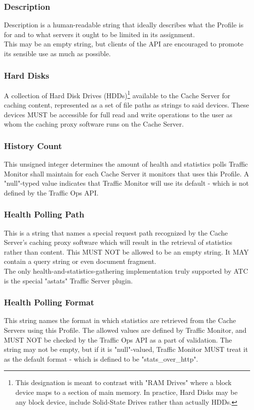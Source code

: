 \subsubsection{Description}
Description is a human-readable string that ideally describes what the Profile
is for and to what servers it ought to be limited in its assignment.\\
This may be an empty string, but clients of the API are encouraged to promote
its sensible use as much as possible.

\subsubsection{Hard Disks}
A collection of Hard Disk Drives (HDDs)\footnote{This designation is meant to
contrast with "RAM Drives" where a block device maps to a section of main
memory. In practice, Hard Disks may be any block device, include Solid-State
Drives rather than actually HDDs.} available to the Cache Server for caching
content, represented as a set of file paths as strings to said devices. These
devices MUST be accessible for full read and write operations to the user as
whom the caching proxy software runs on the Cache Server.

\subsubsection{History Count}
This unsigned integer determines the amount of health and statistics polls
Traffic Monitor shall maintain for each Cache Server it monitors that uses this
Profile. A "null"-typed value indicates that Traffic Monitor will use its
default - which is not defined by the Traffic Ops API.

\subsubsection{Health Polling Path}
This is a string that names a special request path recognized by the Cache
Server's caching proxy software which will result in the retrieval of statistics
rather than content. This MUST NOT be allowed to be an empty string. It MAY
contain a query string or even document fragment.\\
The only health-and-statistics-gathering implementation truly supported by ATC
is the special "astats" Traffic Server plugin.

\subsubsection{Health Polling Format}
This string names the format in which statistics are retrieved from the Cache
Servers using this Profile. The allowed values are defined by Traffic Monitor,
and MUST NOT be checked by the Traffic Ops API as a part of validation. The
string may not be empty, but if it is "null"-valued, Traffic Monitor MUST treat
it as the default format - which is defined to be "stats\_over\_http".

